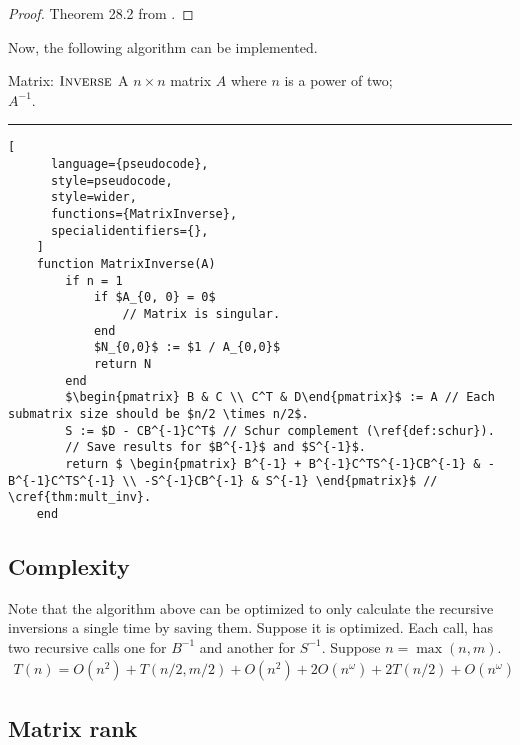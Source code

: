 \begin{proof}
    Theorem 28.2 from \citet{CLRS}.
\end{proof}

Now, the following algorithm can be implemented.
\begin{programruledcaption}{Matrix: \(\textsc{Inverse}\)}
    \noindent
     A \(n \times n\) matrix \(A\) where \(n\) is a power of two; \\
     \(A^{-1}\). 

    \noindent \hrule
    \begin{lstlisting}[
      language={pseudocode},
      style=pseudocode,
      style=wider,
      functions={MatrixInverse},
      specialidentifiers={},
    ]
    function MatrixInverse(A) 
        if n = 1  
            if $A_{0, 0} = 0$ 
                // Matrix is singular.
            end
            $N_{0,0}$ := $1 / A_{0,0}$
            return N
        end
        $\begin{pmatrix} B & C \\ C^T & D\end{pmatrix}$ := A // Each submatrix size should be $n/2 \times n/2$.
        S := $D - CB^{-1}C^T$ // Schur complement (\ref{def:schur}).
        // Save results for $B^{-1}$ and $S^{-1}$.
        return $ \begin{pmatrix} B^{-1} + B^{-1}C^TS^{-1}CB^{-1} & -B^{-1}C^TS^{-1} \\ -S^{-1}CB^{-1} & S^{-1} \end{pmatrix}$ // \cref{thm:mult_inv}.
    end
    \end{lstlisting}
\end{programruledcaption}

\subsection*{Complexity}
Note that the algorithm above can be optimized to only calculate the recursive inversions a single time by saving them.
Suppose it is optimized.
Each call, has two recursive calls one for \(B^{-1}\) and another for \(S^{-1}\).
Suppose \(n = \max(n, m)\).
\begin{align}
    T(n) = O(n^2) + T(n/2, m/2) + O(n^2) + 2O(n^\omega) + 2T(n/2) + O(n^\omega)
\end{align}

\subsection{Matrix rank}